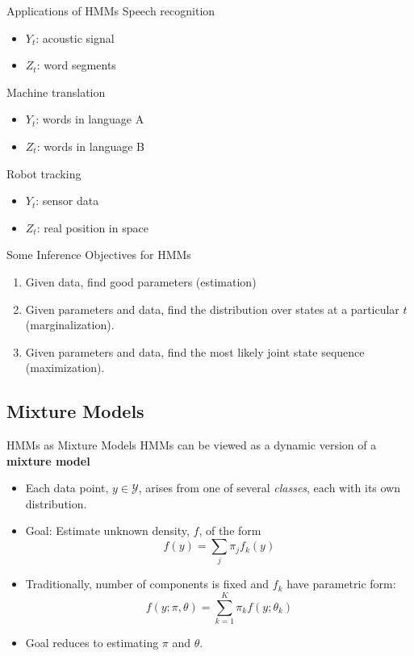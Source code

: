 \documentclass[11pt, mathserif, handout, table]{beamer}
\begin{document}
\begin{frame}{Applications of HMMs}
  Speech recognition
  \begin{itemize}
  \item $Y_t$: acoustic signal
  \item $Z_t$: word segments
  \end{itemize}
  Machine translation
  \begin{itemize}
  \item $Y_t$: words in language A
  \item $Z_t$: words in language B
  \end{itemize}
  Robot tracking
  \begin{itemize}
  \item $Y_t$: sensor data
  \item $Z_t$: real position in space
  \end{itemize}
\end{frame}

\begin{frame}{Some Inference Objectives for HMMs}
  \begin{enumerate}
  \item Given data, find good parameters
    (estimation)
  \item Given parameters and data, find the distribution over states at a
    particular $t$ (marginalization).
  \item Given parameters and data, find the most likely joint state
    sequence (maximization).
  \end{enumerate}
  
\end{frame}

\subsection{Mixture Models}
\label{sec:mixture-models}

\begin{frame}{HMMs as Mixture Models}
  HMMs can be viewed as a dynamic version of a {\bf mixture model}
  \begin{itemize}[<+->]
  \item Each data point, $y \in \mathcal{Y}$, 
    arises from one of several {\em classes}, each with its
    own distribution.
  \item Goal: Estimate unknown density, $f$, of the form
    \begin{equation*}
      \label{eq:3}
      f(y) = \sum_{j} \pi_j f_k(y)
    \end{equation*}
  \item Traditionally, number of components is fixed and $f_k$ have parametric form:
    \begin{equation}
      \label{eq:4}
      f(y; \pi, \theta) = \sum_{k=1}^K \pi_k f(y; \theta_k)
    \end{equation}
  \item Goal reduces to estimating $\pi$ and $\theta$.
  \end{itemize}
\end{frame}
\end{document}
